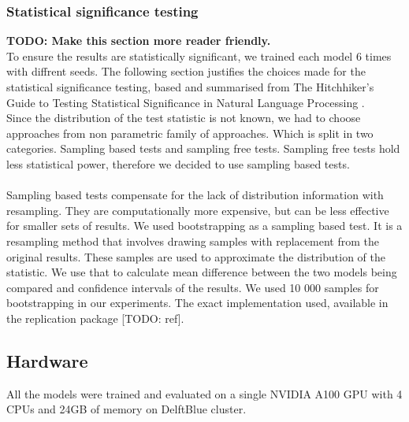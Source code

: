 \subsubsection{Statistical significance testing}
\textbf{TODO: Make this section more reader friendly.} \\
To ensure the results are statistically significant, we trained each model 6 times with diffrent seeds. The following section justifies the choices made for the statistical significance testing, based and summarised from The Hitchhiker’s Guide to Testing Statistical Significance in Natural Language Processing \cite{dror2018hitchhikers}. \\
Since the distribution of the test statistic is not known, we had to choose approaches from non parametric family of approaches. Which is split in two categories. Sampling based tests and sampling free tests. Sampling free tests hold less statistical power, therefore we decided to use sampling based tests.
\\\\
Sampling based tests compensate for the lack of distribution information with resampling. They are computationally more expensive, but can be less effective for smaller sets of results. We used bootstrapping as a sampling based test. It is a resampling method that involves drawing samples with replacement from the original results. These samples are used to approximate the distribution of the statistic. We use that to calculate mean difference between the two models being compared and confidence intervals of the results. We used 10 000 samples for bootstrapping in our experiments. The exact implementation used, available in the replication package [TODO: ref].

\subsection{Hardware}
All the models were trained and evaluated on a single NVIDIA A100 GPU with 4 CPUs and 24GB of memory on DelftBlue cluster.



